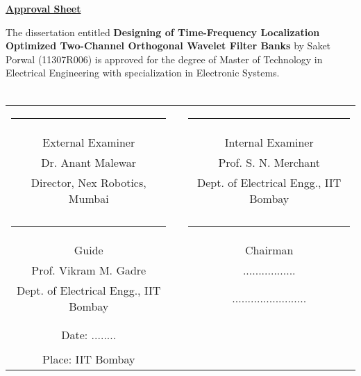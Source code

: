 \begin{titlepage}
\onehalfspacing
\begin{center}
	
\vspace{1cm}
\textbf{\large{\underline{Approval Sheet}}}\\
\vspace{0.5cm}
\end{center}
\doublespacing
The dissertation entitled \textbf{Designing of Time-Frequency Localization Optimized Two-Channel Orthogonal Wavelet Filter Banks} by Saket Porwal (11307R006) is approved for the degree of Master of Technology in Electrical Engineering with specialization in Electronic Systems.
\\ \\
\begin{center}
 \vfill \vfill
 \begin{tabular}{ccc}
      \rule{6cm}{1sp}                & \rule{10mm}{0pt} & \rule{6cm}{1sp} \\
      {\Large External Examiner}              && {\Large Internal Examiner} \\
      {Dr. Anant Malewar}	     && {Prof. S. N. Merchant} \\			  	
      {Director, Nex Robotics, Mumbai} && {Dept. of Electrical Engg., IIT Bombay } \\[0.2in]\\
      \rule{6cm}{1sp}                & \rule{10mm}{0pt} & \rule{6cm}{1sp} \\
      {\Large Guide}                 && {\Large Chairman} \\
      {Prof. Vikram M. Gadre}	     && {.................} \\
      {Dept. of Electrical Engg., IIT Bombay}	     && {........................}\\[0.2in]\\	\\
      {\Large Date: ........ }   && \\ && \\
      {\Large Place: IIT Bombay}	&&	
   \end{tabular}
 \vfill \vfill
% 
\end{center}
\end{titlepage}